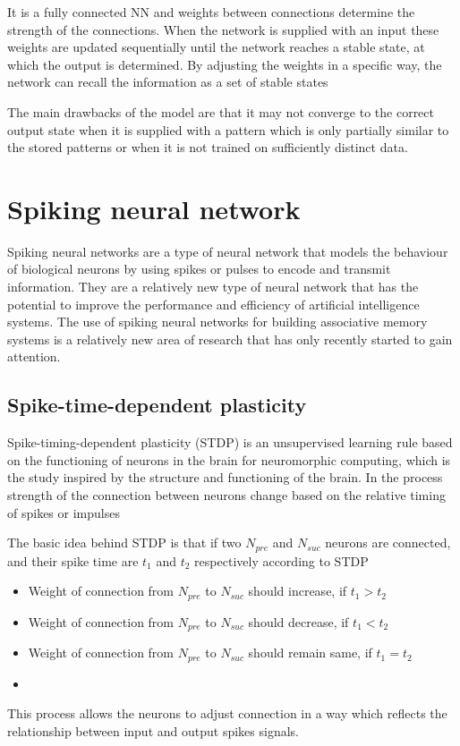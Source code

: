 It is a fully connected NN and weights between connections determine the
strength of the connections. When the network is supplied with an input these
weights are updated sequentially until the network reaches a stable state, at
which the output is determined. By adjusting the weights in a specific way, the
network can recall the information as a set of stable states

The main drawbacks of the model are that it may not converge to the correct output
state when it is supplied with a pattern which is only partially similar to the
stored patterns or when it is not trained on sufficiently distinct data.

\section{Spiking neural network}
Spiking neural networks are a type of neural network that models the behaviour
of biological neurons by using spikes or pulses to encode and transmit
information. They are a relatively new type of neural network that has the
potential to improve the performance and efficiency of artificial intelligence
systems. The use of spiking neural networks for building associative memory
systems is a relatively new area of research that has only recently started to
gain attention.
\subsection{Spike-time-dependent plasticity}
Spike-timing-dependent plasticity (STDP)\cite{stdp} is an unsupervised learning
rule based on the functioning of neurons in the brain for neuromorphic
computing, which is the study inspired by the structure and functioning of the
brain. In the process strength of the connection between neurons change based
on the relative timing of spikes or impulses

The basic idea behind STDP is that if two $N_{pre}$ and $N_{suc}$ neurons are
connected, and their spike time are $t_1$ and $t_2$ respectively according to
STDP \vspace*{-.3pc}
\begin{itemize}
    \item[]Weight of connection from $N_{pre}$ to $N_{suc}$ should  increase, if {\boldmath$t_1>t_2$}
    \item[]Weight of connection from $N_{pre}$ to $N_{suc}$ should  decrease, if {\boldmath$t_1<t_2$}
    \item[]Weight of connection from $N_{pre}$ to $N_{suc}$ should  remain same, if {\boldmath$t_1=t_2$}
    \item[]
\end{itemize}
\vspace*{-2.5pc}
This process allows the neurons to adjust connection in a way which reflects
the relationship between input and output spikes signals.
